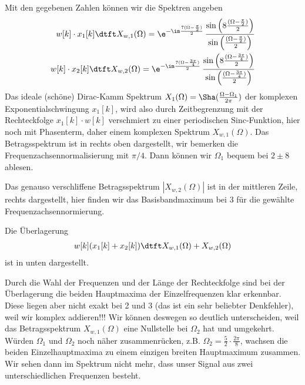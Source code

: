 %
\begin{Loesung}
Mit den gegebenen Zahlen können wir die Spektren angeben
\begin{align}
w[k] \cdot x_1[k]\dtft
X_{w,1}(\Omega) = \e^{-\im\frac{7(\Omega-\frac{\pi}{2})}{2}}\,
\frac{\sin\left(8\frac{(\Omega-\frac{\pi}{2})}{2}\right)}{\sin\left(\frac{(\Omega-\frac{\pi}{2})}{2}\right)}
%
\\
w[k] \cdot x_2[k]\dtft
X_{w,2}(\Omega) = \e^{-\im\frac{7(\Omega-\frac{3\pi}{4})}{2}}\,
\frac{\sin\left(8\frac{(\Omega-\frac{3\pi}{4})}{2}\right)}{\sin\left(\frac{(\Omega-\frac{3\pi}{4})}{2}\right)}
\end{align}
%
Das ideale (schöne) Dirac-Kamm Spektrum $X_1(\Omega)=\Sha(\frac{\Omega-\Omega_1}{2\pi})$
der komplexen Exponentialschwingung $x_1[k]$, wird also durch
Zeitbegrenzung mit der Rechteckfolge $x_1[k]\cdot w[k]$ verschmiert zu einer periodischen Sinc-Funktion,
hier noch mit Phasenterm, daher einem komplexen Spektrum $X_{w,1}(\Omega)$.
%
Das Betragsspektrum ist in  rechts oben dargestellt,
wir bemerken die Frequenzachsennormalisierung mit $\pi/4$. Dann können wir
$\Omega_1$ bequem bei $2 \pm 8$ ablesen.

Das genauso verschliffene Betragsspektrum $|X_{w,2}(\Omega)|$ ist in der mittleren Zeile, rechts
dargestellt, hier finden wir das Basisbandmaximum bei $3$ für die gewählte Frequenzachsennormierung.

Die Überlagerung
\begin{align}
w[k](x_1[k]+x_2[k]) \dtft   X_{w,1}(\Omega) + X_{w,2}(\Omega)
\end{align}
ist in  unten dargestellt.

Durch die Wahl der Frequenzen und der Länge der Rechteckfolge
sind bei der Überlagerung die beiden Hauptmaxima der Einzelfrequenzen klar erkennbar.
Diese liegen aber nicht exakt bei 2 und 3 (das ist ein sehr beliebter Denkfehler),
weil wir komplex addieren!!! Wir können
deswegen so deutlich unterscheiden, weil das Betragsspektrum
$X_{w,1}(\Omega)$ eine Nullstelle bei $\Omega_2$ hat und umgekehrt.
Würden $\Omega_1$ und $\Omega_2$ noch näher zusammenrücken, z.B. $\Omega_2=\frac{5}{2}\cdot\frac{2\pi}{8}$,
wachsen die beiden Einzelhauptmaxima zu einem einzigen breiten Hauptmaximum zusammen.
Wir sehen dann im Spektrum nicht mehr, dass unser Signal aus zwei unterschiedlichen Frequenzen besteht.
%
\end{Loesung}

